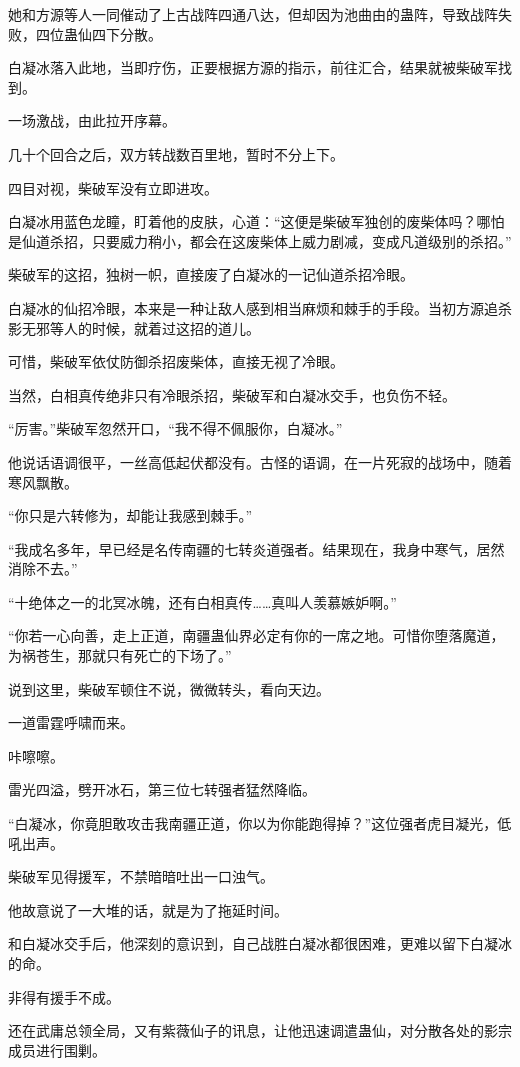\begin{this_body}
她和方源等人一同催动了上古战阵四通八达，但却因为池曲由的蛊阵，导致战阵失败，四位蛊仙四下分散。

白凝冰落入此地，当即疗伤，正要根据方源的指示，前往汇合，结果就被柴破军找到。

一场激战，由此拉开序幕。

几十个回合之后，双方转战数百里地，暂时不分上下。

四目对视，柴破军没有立即进攻。

白凝冰用蓝色龙瞳，盯着他的皮肤，心道：“这便是柴破军独创的废柴体吗？哪怕是仙道杀招，只要威力稍小，都会在这废柴体上威力剧减，变成凡道级别的杀招。”

柴破军的这招，独树一帜，直接废了白凝冰的一记仙道杀招冷眼。

白凝冰的仙招冷眼，本来是一种让敌人感到相当麻烦和棘手的手段。当初方源追杀影无邪等人的时候，就着过这招的道儿。

可惜，柴破军依仗防御杀招废柴体，直接无视了冷眼。

当然，白相真传绝非只有冷眼杀招，柴破军和白凝冰交手，也负伤不轻。

“厉害。”柴破军忽然开口，“我不得不佩服你，白凝冰。”

他说话语调很平，一丝高低起伏都没有。古怪的语调，在一片死寂的战场中，随着寒风飘散。

“你只是六转修为，却能让我感到棘手。”

“我成名多年，早已经是名传南疆的七转炎道强者。结果现在，我身中寒气，居然消除不去。”

“十绝体之一的北冥冰魄，还有白相真传……真叫人羡慕嫉妒啊。”

“你若一心向善，走上正道，南疆蛊仙界必定有你的一席之地。可惜你堕落魔道，为祸苍生，那就只有死亡的下场了。”

说到这里，柴破军顿住不说，微微转头，看向天边。

一道雷霆呼啸而来。

咔嚓嚓。

雷光四溢，劈开冰石，第三位七转强者猛然降临。

“白凝冰，你竟胆敢攻击我南疆正道，你以为你能跑得掉？”这位强者虎目凝光，低吼出声。

柴破军见得援军，不禁暗暗吐出一口浊气。

他故意说了一大堆的话，就是为了拖延时间。

和白凝冰交手后，他深刻的意识到，自己战胜白凝冰都很困难，更难以留下白凝冰的命。

非得有援手不成。

还在武庸总领全局，又有紫薇仙子的讯息，让他迅速调遣蛊仙，对分散各处的影宗成员进行围剿。


\end{this_body}
